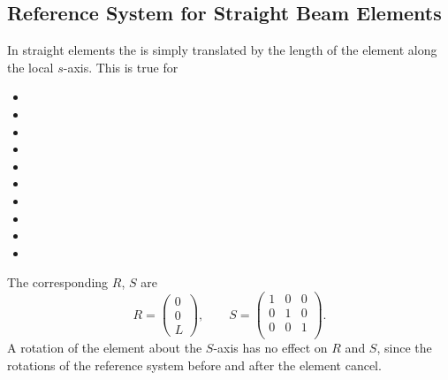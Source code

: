\subsection{Reference System for Straight Beam Elements}
\label{sec:straight}
In straight elements the  
is simply translated by the length of the element along the local $s$-axis.
This is true for
\begin{itemize}
\item {}
\item {}
\item {}
\item {}
\item {}
\item {}
\item {}
\item {}
\item {}
\item {}
\end{itemize}
The corresponding $R$, $S$ are
\[
R=\left(\begin{array}{c}
    0 \\
    0 \\
    L
  \end{array}\right),
\qquad
S=\left(\begin{array}{ccc}
    1 & 0 & 0 \\
    0 & 1 & 0 \\
    0 & 0 & 1 \\
  \end{array}\right).
\]
A rotation of the element about the $S$-axis has no effect
on $R$ and $S$, since the rotations of the reference system 
before and after the element cancel.

